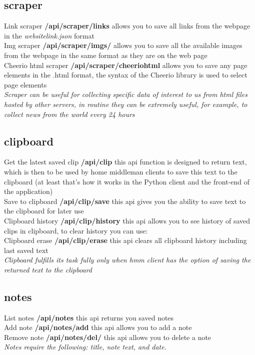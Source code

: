 \documentclass{article}
\begin{document}
\subsection{scraper}
Link scraper \textbf{/api/scraper/links} allows you to save all links from the webpage in the \textit{websitelink.json} format\\
Img scraper \textbf{/api/scraper/imgs/} allows you to save all the available images from the webpage in the same format as they are on the web page\\
Cheerio html scraper \textbf{/api/scraper/cheeriohtml} allows you to save any page elements in the .html format, the syntax of the Cheerio library is used to select page elements\\
\textit{Scraper can be useful for collecting specific data of interest to us from html files hosted by other servers, in routine they can be extremely useful, for example, to collect news from the world every 24 hours}
\subsection{clipboard}
Get the latest saved clip \textbf{/api/clip} this api function is designed to return text, which is then to be used by home middleman clients to save this text to the clipboard (at least that's how it works in the Python client and the front-end of the application)\\
Save to clipboard \textbf{/api/clip/save} this api gives you the ability to save text to the clipboard for later use\\
Clipboard history \textbf{/api/clip/history} this api allows you to see history of saved clips in clipboard, to clear history you can use:\\
Clipboard erase \textbf{/api/clip/erase} this api clears all clipboard history including last saved text\\
\textit{Clipboard fulfills its task fully only when hmm client has the option of saving the returned text to the clipboard}
\subsection{notes}
List notes \textbf{/api/notes} this api returns you saved notes\\
Add note \textbf{/api/notes/add} this api allows you to add a note\\
Remove note \textbf{/api/notes/del/} this api allows you to delete a note\\
\textit{Notes require the following: title, note text, and date.}
\end{document}
